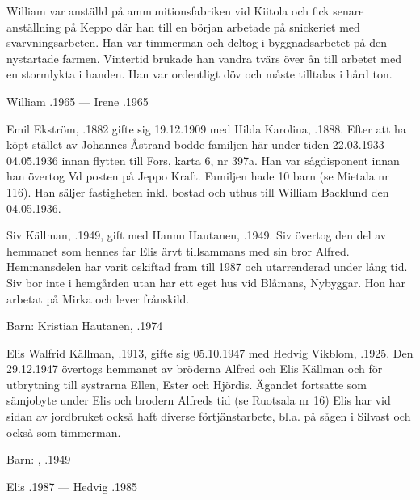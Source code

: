 William var anställd på ammunitionsfabriken vid Kiitola och fick senare anställning på Keppo där han till en början arbetade på snickeriet med svarvningsarbeten. Han var timmerman och deltog i byggnadsarbetet på den nystartade farmen. Vintertid brukade han vandra tvärs över ån till arbetet med en stormlykta i handen. Han var ordentligt döv och måste tilltalas i hård ton.

William .1965  ---  Irene .1965


Emil Ekström, .1882 gifte sig 19.12.1909 med Hilda Karolina, .1888. Efter att ha köpt stället av Johannes Åstrand bodde familjen här under tiden 22.03.1933--04.05.1936 innan flytten till Fors, karta 6, nr 397a. Han var sågdisponent innan han övertog Vd posten på Jeppo Kraft. Familjen hade 10 barn (se Mietala nr 116). Han säljer fastigheten inkl. bostad och uthus till William Backlund den 04.05.1936.






Siv Källman, .1949, gift med Hannu Hautanen, .1949. Siv övertog den del av hemmanet som hennes far Elis ärvt tillsammans med sin bror Alfred. Hemmansdelen har varit oskiftad fram till 1987 och utarrenderad under lång tid. Siv bor inte i hemgården utan har ett eget hus vid Blåmans, Nybyggar. Hon har arbetat på Mirka och lever frånskild.

Barn: Kristian Hautanen, .1974


Elis Walfrid Källman, .1913, gifte sig 05.10.1947 med Hedvig Vikblom, .1925. Den 29.12.1947 övertogs hemmanet av bröderna Alfred och Elis Källman och för utbrytning till systrarna Ellen, Ester och Hjördis. Ägandet fortsatte som sämjobyte under Elis och brodern Alfreds tid (se Ruotsala nr 16) Elis har vid sidan av jordbruket också haft diverse förtjänstarbete, bl.a. på sågen i Silvast och också som timmerman.

Barn: , .1949

Elis .1987  ---  Hedvig .1985


